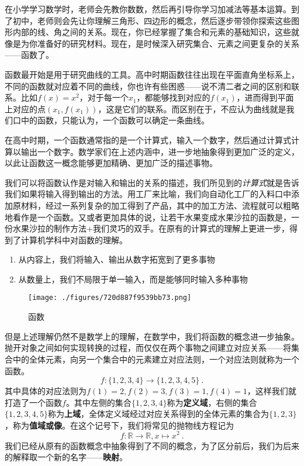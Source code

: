 

\begin{issues}
\issueDraft
\issueTODO
\end{issues}


在小学学习数学时，老师会先教你数数，然后再引导你学习加减法等基本运算。到了初中，老师则会先让你理解三角形、四边形的概念，然后逐步带领你探索这些图形内部的线、角之间的关系。现在，你已经掌握了集合和元素的基础知识，这些就像是为你准备好的研究材料。现在，是时候深入研究集合、元素之间更复杂的关系——函数了。


函数最开始是用于研究曲线的工具。高中时期函数往往出现在平面直角坐标系上，不同的函数就对应着不同的曲线，你也许有些困惑——说不清二者之间的区别和联系。比如$f(x)=x^2$，对于每一个$x_1$，都能够找到对应的$f(x_1)$，进而得到平面上对应的点$(x_1,f(x_1))$，这是它们的联系。而区别在于，不应认为曲线就是我们口中的函数，只能认为，一个函数可以确定一条曲线。

在高中时期，一个函数通常指的是一个计算式，输入一个数字，然后通过计算式计算以输出一个数字。数学家们在上述内涵中，进一步地抽象得到更加广泛的定义，以此让函数这一概念能够更加精确、更加广泛的描述事物。

我们可以将函数认作是对输入和输出的关系的描述，我们所见到的\textsl{计算式}就是告诉我们如果将输入得到输出的方法。用工厂来比喻，我们向自动化工厂的入料口中添加原材料，经过一系列复杂的加工得到了产品，其中的加工方法、流程就可以粗略地看作是一个函数。又或者更加具体的说，让若干水果变成水果沙拉的函数是，一份水果沙拉的制作方法+我们灵巧的双手。在原有的计算式的理解上更进一步，得到了计算机学科中对函数的理解。
\begin{enumerate}
\item 从内容上，我们将输入、输出从数字拓宽到了更多事物
\item 从数量上，我们不局限于单一输入，而是能够同时输入多种事物
\end{enumerate}


\begin{figure}[ht]
\centering
\texttt{[image: ./figures/720d887f9539bb73.png]}
\caption{函数} \label{fig_functi_1}
\end{figure}

但是上述理解仍然不是数学上的理解，在数学中，我们将函数的概念进一步抽象。抛开对象之间如何实现转换的过程，而仅仅在两个事物之间建立对应关系——将集合中的全体元素，向另一个集合中的元素建立对应法则，一个对应法则就称为一个函数。
$$f:\{1,2,3,4\}\to\{1,2,3,4,5\}~.$$
其中具体的对应法则为$f(1)=2,f(2)=3,f(3)=1,f(4)=1$，这样我们就打造了一个函数$f$。其中左侧的集合$\{1,2,3,4\}$称为\textbf{定义域}，右侧的集合$\{1,2,3,4,5\}$称为\textbf{上域}，全体定义域经过对应关系得到的全体元素的集合为$\{1,2,3\}$，称为\textbf{值域或像}。在这个记号下，我们将常见的抛物线方程记为
\begin{equation}
f:\mathbb{R}\to{\mathbb{R}},x\mapsto{x^2}~.
\end{equation}
我们已经从原有的函数概念中抽象得到了不同的概念，为了区分前后，我们为后来的解释取一个新的名字——\textbf{映射}。

